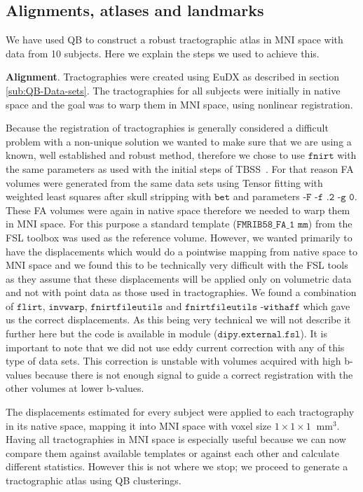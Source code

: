 \documentclass[preprint,authoryear,a4paper,10pt,onecolumn]{elsarticle}
\begin{document}
\subsection{Alignments, atlases and landmarks\label{sub:Atlases-made-easy}}

We have used QB to construct a robust tractographic atlas in MNI space
with data from 10 subjects. Here we explain the steps we used to achieve
this.

\textbf{Alignment}. Tractographies were created using EuDX as described
in section \ref{sub:QB-Data-sets}. The tractographies for all subjects
were initially in native space and the goal was to warp them in MNI
space, using nonlinear registration.

Because the registration of tractographies is generally considered a
difficult problem with a non-unique solution we wanted to make sure that
we are using a known, well established and robust method, therefore we
chose to use $\texttt{fnirt}$ with the same parameters as used with the
initial steps of TBSS~\citep{Smith2006NeuroImage}. For that reason FA
volumes were generated from the same data sets using Tensor fitting with
weighted least squares after skull stripping with $\texttt{bet}$ and
parameters $\texttt{-F -f .2 -g 0}$. These FA volumes were again in
native space therefore we needed to warp them in MNI space. For this
purpose a standard template ($\texttt{FMRIB58\_FA\_1~mm}$) from the FSL
toolbox was used as the reference volume. However, we wanted primarily
to have the displacements which would do a pointwise mapping from
native space to MNI space and we found this to be technically very
difficult with the FSL tools as they assume that these displacements
will be applied only on volumetric data and not with point data as those
used in tractographies. We found a combination of $\texttt{flirt}$,
$\texttt{invwarp}$, $\texttt{fnirtfileutils}$ and
$\texttt{fnirtfileutils -withaff}$ which gave us the correct
displacements. As this being very technical we will not describe it
further here but the code is available in module
($\texttt{dipy.external.fsl}$). It is important to note that we did not
use eddy current correction with any of this type of data sets. This
correction is unstable with volumes acquired with high b-values because
there is not enough signal to guide a correct registration with the
other volumes at lower b-values.

The displacements estimated for every subject were applied
to each tractography in its native space, mapping it into MNI
space with voxel size $1\times1\times1~\textrm{~mm}^{3}$. Having all
tractographies in MNI space is especially useful because we can now
compare them against available templates or against each other and
calculate different statistics. However this is not where we stop; we
proceed to generate a tractographic atlas using QB clusterings.
\end{document}
